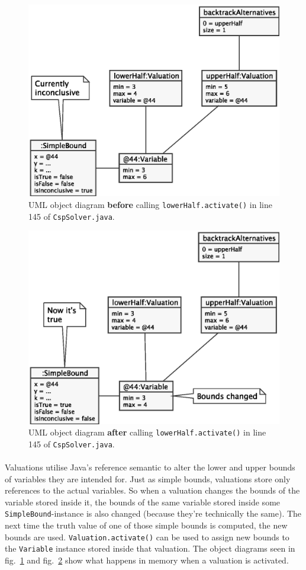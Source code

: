 \begin{multicols}{2}

\begin{figure}[H]
  \includegraphics[width=.5\textwidth]{images/valuation-before}
  \caption{UML object diagram \textbf{before} calling \texttt{lowerHalf.activate()} in line 145 of \texttt{CspSolver.java}.}
  \label{fig:valuation-before}
\end{figure}

\columnbreak    

\begin{figure}[H]
  \includegraphics[width=.5\textwidth]{images/valuation-after}
  \caption{UML object diagram \textbf{after} calling \texttt{lowerHalf.activate()} in line 145 of \texttt{CspSolver.java}.}
  \label{fig:valuation-after}
\end{figure}

\end{multicols}


\paragraph{}
Valuations utilise Java's reference semantic to alter the lower and upper bounds of variables they are intended for.
Just as simple bounds, valuations store only references to the actual variables.
So when a valuation changes the bounds of the variable stored inside it, the bounds of the same variable stored inside some \texttt{SimpleBound}-instance is also changed (because they're technically the same).
The next time the truth value of one of those simple bounds is computed, the new bounds are used.
\texttt{Valuation.activate()} can be used to assign new bounds to the \texttt{Variable} instance stored inside that valuation.
The object diagrams seen in fig.~\ref{fig:valuation-before} and fig.~\ref{fig:valuation-after} show what happens in memory when a valuation is activated.

